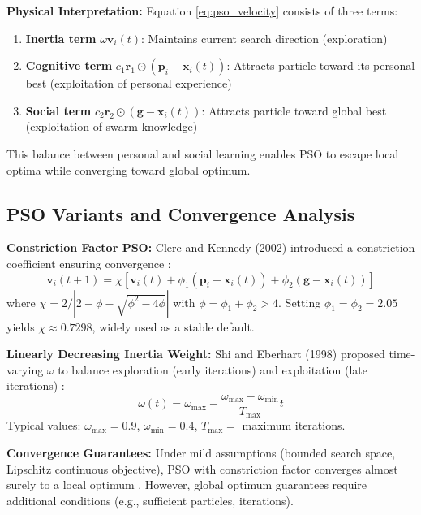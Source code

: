 \textbf{Physical Interpretation:} Equation \eqref{eq:pso_velocity} consists of three terms:
\begin{enumerate}
\item \textbf{Inertia term} $\omega \mathbf{v}_i(t)$: Maintains current search direction (exploration)
\item \textbf{Cognitive term} $c_1 \mathbf{r}_1 \odot (\mathbf{p}_i - \mathbf{x}_i(t))$: Attracts particle toward its personal best (exploitation of personal experience)
\item \textbf{Social term} $c_2 \mathbf{r}_2 \odot (\mathbf{g} - \mathbf{x}_i(t))$: Attracts particle toward global best (exploitation of swarm knowledge)
\end{enumerate}

This balance between personal and social learning enables PSO to escape local optima while converging toward global optimum.

\subsection{PSO Variants and Convergence Analysis}

\textbf{Constriction Factor PSO:} Clerc and Kennedy (2002) introduced a constriction coefficient ensuring convergence \cite{clerc2002constriction}:
\begin{equation}
\mathbf{v}_i(t+1) = \chi [\mathbf{v}_i(t) + \phi_1 (\mathbf{p}_i - \mathbf{x}_i(t)) + \phi_2 (\mathbf{g} - \mathbf{x}_i(t))]
\label{eq:constriction_pso}
\end{equation}
where $\chi = 2 / |2 - \phi - \sqrt{\phi^2 - 4\phi}|$ with $\phi = \phi_1 + \phi_2 > 4$. Setting $\phi_1 = \phi_2 = 2.05$ yields $\chi \approx 0.7298$, widely used as a stable default.

\textbf{Linearly Decreasing Inertia Weight:} Shi and Eberhart (1998) proposed time-varying $\omega$ to balance exploration (early iterations) and exploitation (late iterations) \cite{shi1998modified}:
\begin{equation}
\omega(t) = \omega_{\max} - \frac{\omega_{\max} - \omega_{\min}}{T_{\max}} t
\label{eq:ldw_pso}
\end{equation}
Typical values: $\omega_{\max} = 0.9$, $\omega_{\min} = 0.4$, $T_{\max} = $ maximum iterations.

\textbf{Convergence Guarantees:} Under mild assumptions (bounded search space, Lipschitz continuous objective), PSO with constriction factor converges almost surely to a local optimum \cite{clerc2002constriction,vandenbergh2006study}. However, global optimum guarantees require additional conditions (e.g., sufficient particles, iterations).

